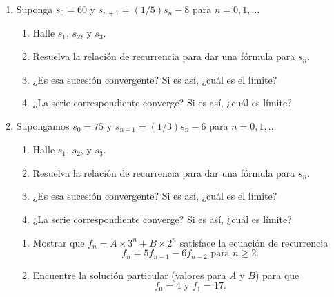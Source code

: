 \begin{enumerate}
    \item Suponga $s_{0}=60$ y $s_{n+1}=(1/5)s_n-8$ para $n=0,1,\ldots$
    \begin{enumerate}
        \item Halle $s_{1}$, $s_{2}$, y $s_{3}$.
        \item Resuelva la relación de recurrencia para dar una fórmula para $s_{n}$.
        \item ¿Es esa sucesión convergente? Si es así, ¿cuál es el límite?
        \item ¿La serie correspondiente converge? Si es así, ¿cuál es límite?
    \end{enumerate}
    \item Supongamos $s_{0}=75$ y $s_{n+1}=(1/3)s_{n}-6$ para $n=0,1,\ldots$
    \begin{enumerate}
        \item Halle $s_{1}$, $s_{2}$, y $s_{3}$.
         \item Resuelva la relación de recurrencia para dar una fórmula para $s_{n}$.
        \item ¿Es esa sucesión convergente? Si es así, ¿cuál es el límite?
        \item ¿La serie correspondiente converge? Si es así, ¿cuál es límite?
    \end{enumerate}
    \begin{enumerate}
        \item Mostrar que $f_{n}=A\times3^{n}+B\times2^{n}$ satisface la ecuación de recurrencia \[ f_{n}=5f_{n-1}-6f_{n-2}\text{ para }n\geq 2. \]
        \item Encuentre la solución particular (valores para $A$ y $B$) para que \[ f_{0}=4\text{ y }f_{1}=17. \]
    \end{enumerate}
\end{enumerate}